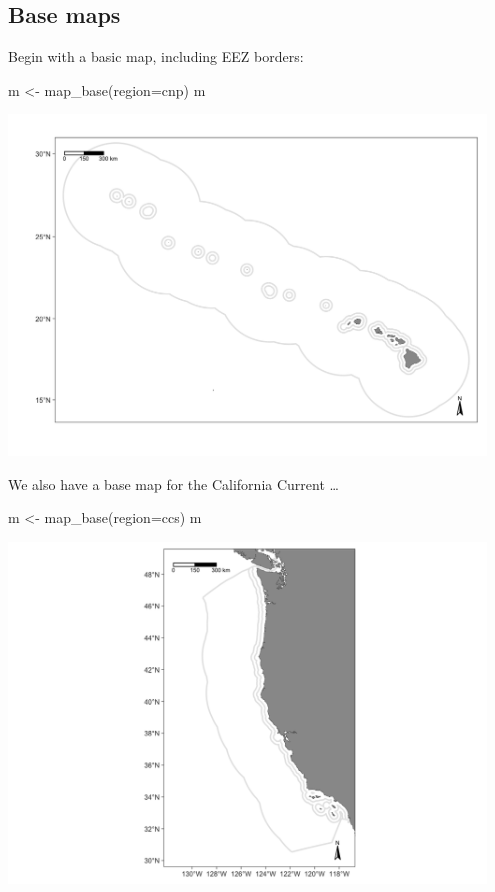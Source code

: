 \documentclass[
]{book}
\newenvironment{Shaded}{\begin{snugshade}}{\end{snugshade}}
\newcommand{\AttributeTok}[1]{\textcolor[rgb]{0.77,0.63,0.00}{#1}}
\newcommand{\FunctionTok}[1]{\textcolor[rgb]{0.00,0.00,0.00}{#1}}
\newcommand{\NormalTok}[1]{#1}
\newcommand{\OtherTok}[1]{\textcolor[rgb]{0.56,0.35,0.01}{#1}}
\newcommand{\StringTok}[1]{\textcolor[rgb]{0.31,0.60,0.02}{#1}}
\begin{document}
\hypertarget{base-maps}{%
\subsection*{Base maps}\label{base-maps}}

Begin with a basic map, including EEZ borders:

\begin{Shaded}
\begin{Highlighting}[]
\NormalTok{m }\OtherTok{\textless{}{-}} \FunctionTok{map\_base}\NormalTok{(}\AttributeTok{region=}\StringTok{\textquotesingle{}cnp\textquotesingle{}}\NormalTok{)}
\NormalTok{m}
\end{Highlighting}
\end{Shaded}

\includegraphics[width=0.95\textwidth,height=\textheight]{img/map_cnp.png}

We also have a base map for the California Current \ldots{}

\begin{Shaded}
\begin{Highlighting}[]
\NormalTok{m }\OtherTok{\textless{}{-}} \FunctionTok{map\_base}\NormalTok{(}\AttributeTok{region=}\StringTok{\textquotesingle{}ccs\textquotesingle{}}\NormalTok{)}
\NormalTok{m}
\end{Highlighting}
\end{Shaded}

\includegraphics[width=0.95\textwidth,height=\textheight]{img/map_ccs.png}
\end{document}
